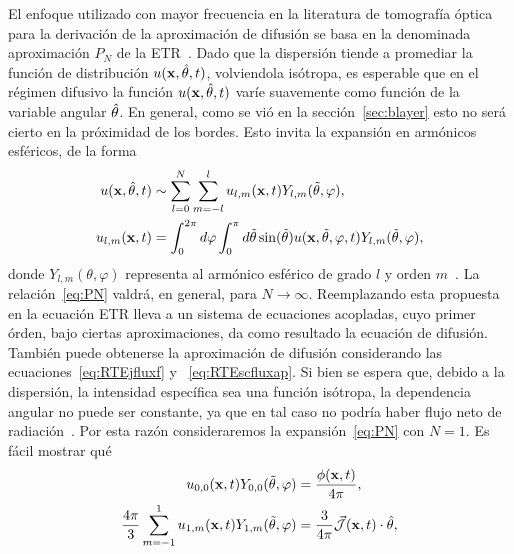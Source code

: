 El enfoque utilizado con mayor frecuencia en la literatura de tomografía óptica para la derivación de la aproximación de difusión se basa 
en la denominada aproximación $P_N$ de la ETR~\cite{Arridge2009}. Dado que la dispersión tiende a promediar la función de distribución $u(\mathbf{x},\hat{\theta},t)$, volviendola isótropa, es esperable que en el régimen difusivo la función $u(\mathbf{x},\hat{\theta},t)$ varíe suavemente como función de la variable angular $\hat{\theta}$. En general, como se vió en la sección~\ref{sec:blayer} esto no será cierto en la próximidad de los bordes. Esto invita la expansión en armónicos esféricos, de la forma 
\begin{equation}
\begin{split}
\begin{aligned}
u(\mathbf{x},\hat{\theta},t)&\sim \sum_{l=0}^{N}\sum_{m=-l}^lu_{l,m}(\mathbf{x},t)Y_{l,m}(\tilde{\theta},\varphi), \\ 
u_{l,m}(\mathbf{x},t)&=\int_{0}^{2\pi} d\varphi \int_0^{\pi} d\tilde{\theta} \sin (\tilde{\theta})  u(\mathbf{x},\tilde{\theta},\varphi,t) Y_{l,m}(\tilde{\theta},\varphi) ,
\end{aligned}
\end{split}
\label{eq:PN}
\end{equation}
donde $Y_{l,m}(\theta,\varphi)$ representa al armónico esférico de grado $l$ y orden $m$~\cite{Sansone1991}. La relación~\eqref{eq:PN} valdrá, en general, para $N \rightarrow \infty$.
Reemplazando esta propuesta en la ecuación ETR lleva a un sistema de ecuaciones acopladas, cuyo primer órden, bajo ciertas aproximaciones, da como resultado la ecuación de difusión. También puede obtenerse la aproximación de difusión considerando las ecuaciones~\eqref{eq:RTEjfluxf} y ~\eqref{eq:RTEscfluxap}. Si bien se espera que, debido a la dispersión, la intensidad específica sea una función isótropa, la dependencia angular no puede ser constante, ya que en tal caso 
no podría haber flujo neto de radiación~\cite{Ishimaru1978}. Por esta razón consideraremos la expansión~\eqref{eq:PN} con $N=1$. 
Es fácil mostrar qué
\begin{equation}
\begin{split}
\begin{aligned}
u_{0,0}(\mathbf{x},t) Y_{0,0}(\tilde{\theta},\varphi) &=\frac{\phi(\mathbf{x},t)}{4\pi},\\
\frac{4\pi}{3} \sum_{m=-1}^1 u_{1,m}(\mathbf{x},t)Y_{1,m} (\tilde{\theta},\varphi) & = \frac{3}{4\pi} \vec{ \mathcal{J}}(\mathbf{x},t) \cdot \hat{\theta},
\end{aligned}
\end{split}
\label{eq:PN2}
\end{equation}
